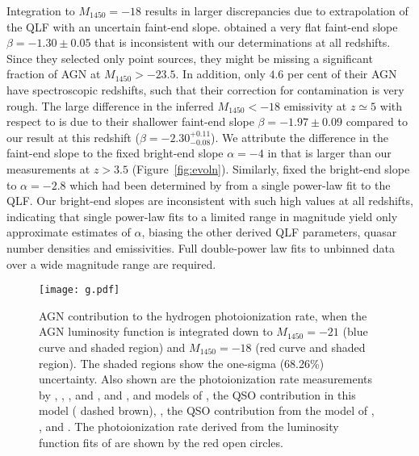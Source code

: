 \documentclass[fleqn,usenatbib]{mnras}
\newcommand{\new}[1]{{\color{notecolor} #1}}
\begin{document}
Integration to $M_{1450}=-18$ results in larger discrepancies due to
extrapolation of the QLF with an uncertain faint-end slope.
\citet{2018PASJ...70S..34A} obtained a very flat faint-end slope
$\beta=-1.30\pm 0.05$ that is inconsistent with our determinations at
all redshifts. Since they selected only point sources, they might be
missing a significant fraction of AGN at $M_{1450}>-23.5$.  In
addition, only $4.6$ per cent of their AGN have spectroscopic
redshifts, such that their correction for contamination is very rough.
The large difference in the inferred $M_{1450}<-18$ emissivity at
$z\simeq 5$ with respect to \citet{2018AJ....155..131M} is due to
their shallower faint-end slope $\beta=-1.97\pm 0.09$ compared to our
result at this redshift ($\beta=-2.30^{+0.11}_{-0.08}$). We attribute
the difference in the faint-end slope to the fixed bright-end slope
$\alpha=-4$ in \citet{2018AJ....155..131M} that is larger than our
measurements at $z>3.5$ (Figure~\ref{fig:evoln}).  Similarly,
\citet{2017ApJ...847L..15O} fixed the bright-end slope to
$\alpha=-2.8$ which had been determined by \citet{2016ApJ...833..222J}
from a single power-law fit to the QLF.  Our
bright-end slopes are inconsistent with such high values at all
redshifts, indicating that single power-law fits to a limited range in
magnitude yield only approximate estimates of $\alpha$, biasing the
other derived QLF parameters, quasar number densities and
emissivities.  Full double-power law fits to unbinned data over a wide
magnitude range are required.

\begin{figure*}
  \begin{center}
    \texttt{[image: g.pdf]}
  \end{center}
  \caption{AGN contribution to the hydrogen photoionization rate, when
    the AGN luminosity function is integrated down to $M_{1450}=-21$
    (blue curve and shaded region) and $M_{1450}=-18$ (red curve and
    shaded region).  The shaded regions show the one-sigma (68.26\%)
    uncertainty.  Also shown are the photoionization rate measurements
    by \citet[filled circles]{2013MNRAS.436.1023B}, \citet[inverted
      triangles]{2011MNRAS.412.2543C},
    \citet[triangles]{2011MNRAS.412.1926W}, \citet[blue
      hexagons]{2018MNRAS.473..560D} and \citet[green
      squares]{2018ApJ...855..106D}, and
    \citet[pentagons]{2017MNRAS.467.3172G}, and models of
    \citet[dotted brown curve]{2012ApJ...746..125H}, the QSO
    contribution in this model (\new{dashed brown}),
    \citet[\new{dotted green}]{2015ApJ...813L...8M}, the QSO
    contribution from the model of \citet[dashed
      orange]{2015MNRAS.451L..30K}, \citet[dotted
      grey]{2017ApJ...837..106O}, and \citet[dashed
      grey]{2018arXiv180104931P}.  The photoionization rate derived
    from the luminosity function fits of \citet{2015AA...578A..83G}
    are shown by the red open circles.}
  \label{fig:gammapi}
\end{figure*}
\end{document}

